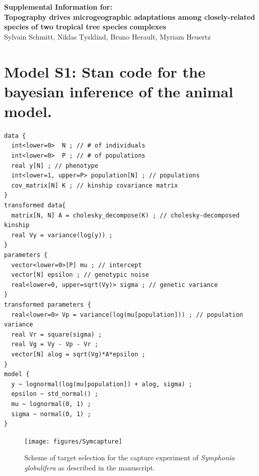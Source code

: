 \documentclass[12pt,]{article}
\begin{document}
\begin{center}
  \normalsize{\textbf{Supplemental Information for:}} \\
  \vspace{5mm}
  \large{\textbf{Topography drives microgeographic adaptations among closely-related species of two tropical tree species complexes}} \\
  \vspace{5mm}
  \normalsize{Sylvain Schmitt, Niklas Tysklind, Bruno Herault, Myriam Heuertz} \\
  \tableofcontents
  \listoftables
  \listoffigures
\end{center}

\newpage

\hypertarget{model-s1-stan-code-for-the-bayesian-inference-of-the-animal-model.}{%
\section{Model S1: Stan code for the bayesian inference of the animal model.}\label{model-s1-stan-code-for-the-bayesian-inference-of-the-animal-model.}}

\begin{verbatim}
data {
  int<lower=0>  N ; // # of individuals
  int<lower=0>  P ; // # of populations
  real y[N] ; // phenotype
  int<lower=1, upper=P> population[N] ; // populations
  cov_matrix[N] K ; // kinship covariance matrix
}
transformed data{
  matrix[N, N] A = cholesky_decompose(K) ; // cholesky-decomposed kinship
  real Vy = variance(log(y)) ;
}
parameters {
  vector<lower=0>[P] mu ; // intercept
  vector[N] epsilon ; // genotypic noise
  real<lower=0, upper=sqrt(Vy)> sigma ; // genetic variance
}
transformed parameters {
  real<lower=0> Vp = variance(log(mu[population])) ; // population variance
  real Vr = square(sigma) ;
  real Vg = Vy - Vp - Vr ;
  vector[N] alog = sqrt(Vg)*A*epsilon ;
}
model {
  y ~ lognormal(log(mu[population]) + alog, sigma) ;
  epsilon ~ std_normal() ;
  mu ~ lognormal(0, 1) ;
  sigma ~ normal(0, 1) ;
}
\end{verbatim}

\newpage

\begin{figure}[H]

{\centering \texttt{[image: figures/Symcapture]} 

}

\caption{Scheme of target selection for the capture experiment of \emph{Symphonia globulifera} as described in the manuscript.}\label{fig:symcapture}
\end{figure}
\end{document}
